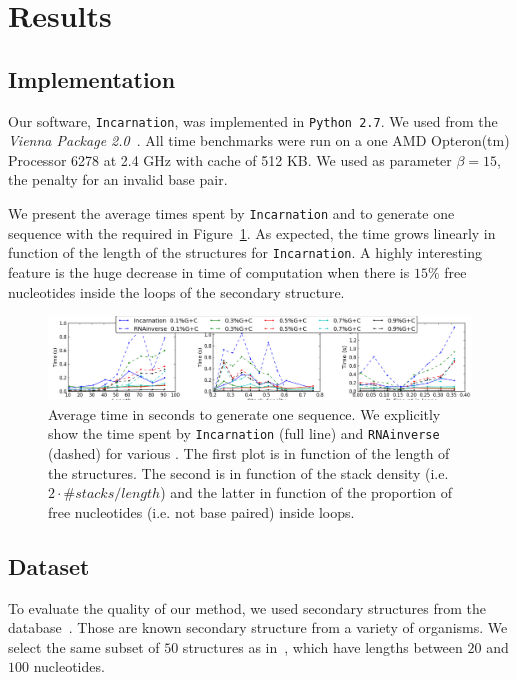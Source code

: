 \section{Results}
\label{sec:results}

\subsection{Implementation}
\label{sec:implementation}
Our software, \texttt{Incarnation}, was implemented in {\tt Python~2.7}. We used
\RNAinverse from the \textit{Vienna Package 2.0}~\cite{Hofacker:1994}.
All time benchmarks were run on a one AMD Opteron(tm) Processor 6278  at 2.4 GHz with cache of 512 KB.
 We used as parameter $\beta=15$, the penalty for an invalid base pair.



We present the average times spent by \texttt{Incarnation} and \RNAinverse to generate one sequence
with the required \GCContent in Figure~\ref{fig:time}. As expected, the time grows linearly
in function of the length of the structures for \texttt{Incarnation}.  A highly interesting feature
is the huge decrease in time of computation when there is $15\%$ free 
nucleotides inside the loops of the secondary structure.

\begin{figure}[ht!]
	\centering
	\includegraphics[width=\textwidth]{Figures/time_rnastrand_clustered_rnainverse_100samples_fix}
	\caption{Average time in seconds to generate one sequence. We explicitly show 
	the time spent by \texttt{Incarnation} (full line) and \texttt{RNAinverse} (dashed) for various \GCContent. The first plot is in function
	of the length of the structures. The second is in function of the stack
	density (i.e. $2\cdot\#stacks/length$) and the latter in function of 
	the proportion of free nucleotides (i.e. not base paired) inside loops.}
	\label{fig:time}	
\end{figure}



\subsection{Dataset}
To evaluate the quality of our method, we used secondary
structures from the \RNASTRAND database~\cite{andronescu2008rna}.
Those are known secondary structure from a variety of organisms.
We select the same subset of $50$ structures as in~\cite{Levin:2012kx}, 
which have lengths between $20$ and $100$ nucleotides. 

